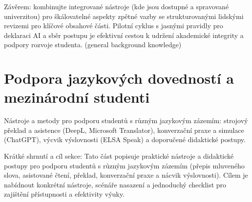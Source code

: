 \documentclass{report}%
\begin{document}
Závěrem: kombinujte integrované nástroje (kde jsou dostupné a spravované univerzitou) pro škálovatelné aspekty zpětné vazby se strukturovanými lidskými revizemi pro klíčové obsahové části. Pilotní cyklus s jasnými pravidly pro deklaraci AI a sběr postupu je efektivní cestou k udržení akademické integrity a podpory rozvoje studenta. (general background knowledge)%

%
\section{Podpora jazykových dovedností a mezinárodní studenti}%
Nástroje a metody pro podporu studentů s různým jazykovým zázemím: strojový překlad a asistence (DeepL, Microsoft Translator), konverzační praxe a simulace (ChatGPT), výcvik výslovnosti (ELSA Speak) a doporučené didaktické postupy.%


%
Krátké shrnutí a cíl sekce: Tato část popisuje praktické nástroje a didaktické postupy pro podporu studentů s různým jazykovým zázemím (přepis mluveného slova, asistované čtení, překlad, konverzační praxe a nácvik výslovnosti). Cílem je nabídnout konkrétní nástroje, scénáře nasazení a jednoduchý checklist pro zajištění přístupnosti a efektivity výuky.
\end{document}
